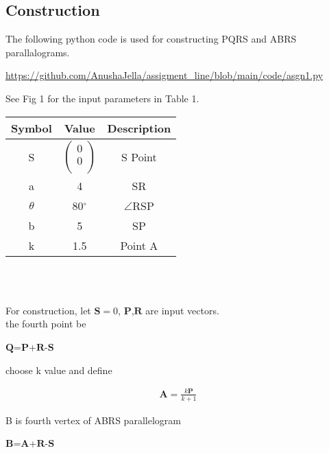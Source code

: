 \documentclass{article}
\begin{document}
\begin{multicols}{2}
 \section*{Construction}
 \begin{flushleft}
 The following python code is used for constructing PQRS and ABRS parallalograms.
 \end{flushleft}
 \begin{mdframed}
   \url{https://github.com/AnushaJella/assigment_line/blob/main/code/asgn1.py}\\
\end{mdframed}
See Fig 1 for the input parameters in Table 1.\\
{\setlength\extrarowheight{2pt}
\begin{tabular}{|c|c|c|}
	\hline
	\textbf{Symbol}&\textbf{Value}&\textbf{Description}\\
	\hline
	S&$\begin{pmatrix}
	0\\0\\
	\end{pmatrix} $&S Point\\
	\hline
	a&4& SR\\
	\hline
	$\theta$&80$^{\circ}$&$\angle$RSP\\
	\hline
	b & 5 & SP\\
	\hline
	k& 1.5 &Point A\\
	\hline
\end{tabular}
}\\
\\
\begin{flushleft}
For construction, let $\boldsymbol{S}=0$, $\boldsymbol{P}$,$\boldsymbol{R}$ are input vectors. \\
the fourth point be\\
\end{flushleft}
\centering $\boldsymbol{Q}$=$\boldsymbol{P}$+$\boldsymbol{R}$-$\boldsymbol{S}$ \\
\begin{flushleft}
choose k value and define\\
\end{flushleft}
\begin{align*}
\boldsymbol{A} =\frac{
	k \boldsymbol{P}}{k+1}
\end{align*}
\begin{flushleft}
B is fourth vertex of ABRS parallelogram\\
\end{flushleft}
\centering $\boldsymbol{B}$=$\boldsymbol{A}$+$\boldsymbol{R}$-$\boldsymbol{S}$ \\

\end{multicols}
\end{document}
